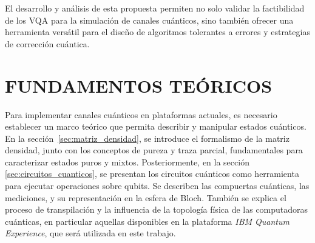 \documentclass[letterpaper,12pt]{thesisECFM}
\theoremstyle{plain}
\theoremstyle{definition}
\theoremstyle{definition}
\theoremstyle{remark}
\newcommand{\1}{\mathbb{1}}
\begin{document}
El desarrollo y análisis de esta propuesta permiten no solo validar la
factibilidad de los VQA para la simulación de canales cuánticos, sino también
ofrecer una herramienta versátil para el diseño de algoritmos tolerantes a
errores y estrategias de corrección cuántica. 
 





\mainmatter %
\chapter{FUNDAMENTOS TEÓRICOS} \label{cap:fundamentos:teoricos} %
Para implementar canales cuánticos en plataformas actuales, es necesario
establecer un marco teórico que permita describir y manipular estados
cuánticos. En la sección~\ref{sec:matriz_densidad}, se introduce el formalismo
de la matriz densidad, junto con los conceptos de pureza y traza parcial,
fundamentales para caracterizar estados puros y mixtos. Posteriormente, en la
sección \ref{sec:circuitos_cuanticos}, se presentan los circuitos cuánticos
como herramienta para ejecutar operaciones sobre qubits. Se describen las
compuertas cuánticas, las mediciones, y su representación en la esfera de
Bloch. También se explica el proceso de transpilación y la influencia de la
topología física de las computadoras cuánticas, en particular aquellas
disponibles en la  plataforma \textit{IBM Quantum Experience}, que será
utilizada en este trabajo.
\end{document}
